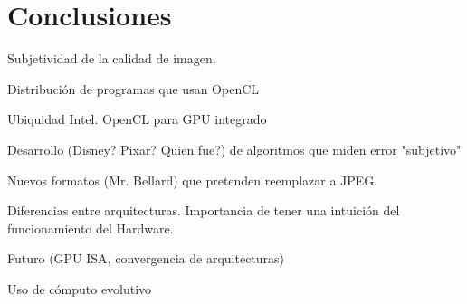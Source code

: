 
\chapter{Conclusiones}\label{ch:conclusiones}

Subjetividad de la calidad de imagen.

Distribución de programas que usan OpenCL

Ubiquidad Intel. OpenCL para GPU integrado

Desarrollo (Disney? Pixar? Quien fue?) de algoritmos que miden error "subjetivo"

Nuevos formatos (Mr. Bellard) que pretenden reemplazar a JPEG.

Diferencias entre arquitecturas. Importancia de tener una intuición del funcionamiento del Hardware.

Futuro (GPU ISA, convergencia de arquitecturas)

Uso de cómputo evolutivo
